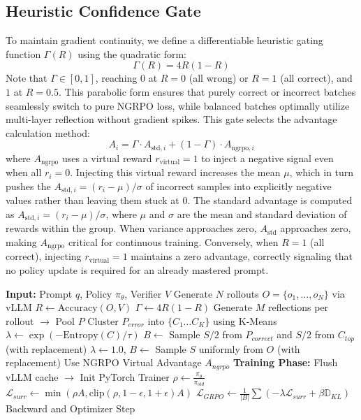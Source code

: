 \subsection{Heuristic Confidence Gate}\label{subsec:heuristic_gate}
To maintain gradient continuity, we define a differentiable heuristic gating function $\Gamma(R)$ using the quadratic form:
\begin{equation}
\Gamma(R) = 4R(1-R)
\end{equation}
Note that $\Gamma \in [0, 1]$, reaching $0$ at $R=0$ (all wrong) or $R=1$ (all correct), and $1$ at $R=0.5$. This parabolic form ensures that purely correct or incorrect batches seamlessly switch to pure NGRPO loss, while balanced batches optimally utilize multi-layer reflection without gradient spikes. This gate selects the advantage calculation method:
\begin{equation}
A_i = \Gamma \cdot A_{\text{std}, i} + (1-\Gamma) \cdot A_{\text{ngrpo}, i}
\end{equation}
where $A_{\text{ngrpo}}$ uses a virtual reward $r_{\text{virtual}} = 1$ to inject a negative signal even when all $r_i=0$. Injecting this virtual reward increases the mean $\mu$, which in turn pushes the $A_{\text{std},i}=(r_i-\mu)/\sigma$ of incorrect samples into explicitly negative values rather than leaving them stuck at 0. The standard advantage is computed as $A_{\text{std}, i} = (r_i - \mu) / \sigma$, where $\mu$ and $\sigma$ are the mean and standard deviation of rewards within the group. When variance approaches zero, $A_{\text{std}}$ approaches zero, making $A_{\text{ngrpo}}$ critical for continuous training. Conversely, when $R=1$ (all correct), injecting $r_{\text{virtual}}=1$ maintains a zero advantage, correctly signaling that no policy update is required for an already mastered prompt.

\begin{algorithm}
\caption{SB-GRPO Training Step}
\label{alg:training_step}
\begin{algorithmic}[1]
\STATE \textbf{Input:} Prompt $q$, Policy $\pi_\theta$, Verifier $V$
\STATE Generate $N$ rollouts $O = \{o_1, \dots, o_N\}$ via vLLM
\STATE $R \gets \text{Accuracy}(O, V)$
\STATE $\Gamma \gets 4R(1-R)$
    \STATE Generate $M$ reflections per rollout $\to$ Pool $P$
    \STATE Cluster $P_{error}$ into $\{C_1 \dots C_K\}$ using K-Means
    \STATE $\lambda \gets \exp(-\text{Entropy}(C)/\tau)$
    \STATE $B \gets$ Sample $S/2$ from $P_{correct}$ and $S/2$ from $C_{top}$ (with replacement)
\ELSE
    \STATE $\lambda \gets 1.0$, $B \gets$ Sample $S$ uniformly from $O$ (with replacement)
    \STATE Use NGRPO Virtual Advantage $A_{ngrpo}$
\ENDIF
\STATE \textbf{Training Phase:}
\STATE Flush vLLM cache $\to$ Init PyTorch Trainer
\STATE $\rho \gets \frac{\pi_\theta}{\pi_{old}}$
\STATE $\mathcal{L}_{surr} \gets \min\left(\rho A, \text{clip}\left(\rho, 1-\epsilon, 1+\epsilon\right)A\right)$
\STATE $\mathcal{L}_{GRPO} \gets \frac{1}{|B|} \sum \left( -\lambda \mathcal{L}_{surr} + \beta \mathbb{D}_{KL} \right)$
\STATE Backward and Optimizer Step
\end{algorithmic}
\end{algorithm}

